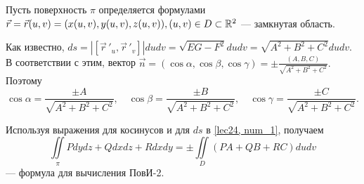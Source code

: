 \documentclass[../../main.tex]{subfiles}
\begin{document}
Пусть поверхность $\pi$ определяется формулами $\vec{r} = \vec{r}(u,v) =
 (x(u,v), y(u,v), z(u,v)), (u, v)\in D\subset \mathbb{R}^2$ --- замкнутая область.

Как известно, $ds = \left|\left[ \vec r\,'_u,  \vec r\,'_v\right]\right|dudv = 
\sqrt{EG - F^2}dudv = \sqrt{A^2 + B^2 + C^2}dudv.$ В соответствии с этим, вектор
 $\vec{n} = (\cos\alpha, \cos\beta, \cos\gamma) = \pm\frac{(A, B, C)}{\sqrt{A^2
 		 + B^2 + C^2}}.$ Поэтому \[\cos\alpha = \frac{\pm A}{\sqrt{A^2 + B^2 + 
 		 C^2}},\quad \cos\beta = \frac{\pm B}{\sqrt{A^2 + B^2 + C^2}},\quad 
 	 \cos\gamma = \frac{\pm C}{\sqrt{A^2 + B^2 + C^2}}.\]

Используя выражения для косинусов и для $ds$ в \eqref{lec24, num_1}, получаем
\begin{equation}\label{lec24, num_2}
\iint\limits_\pi Pdydz + Qdxdz + Rdxdy = \pm \iint\limits_D(PA + QB + RC)dudv
\end{equation}
--- формула для вычисления ПовИ-2.
\end{document}
